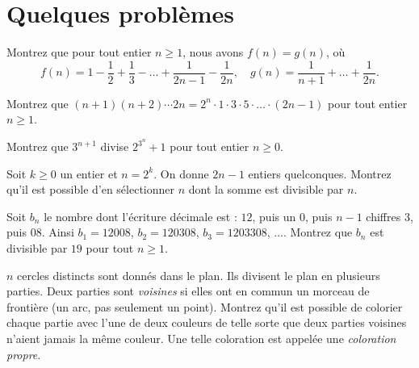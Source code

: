 \section*{Quelques problèmes}

\begin{problem}
Montrez que pour tout entier $n \geq 1$, nous avons $f(n) = g(n)$, où
\[
f(n) = 1 - \frac{1}{2} + \frac{1}{3} - \dots + \frac{1}{2n-1} - \frac{1}{2n}, \quad g(n) = \frac{1}{n+1} + \dots + \frac{1}{2n}.
\]
\end{problem}

\begin{problem}
Montrez que $(n+1)(n+2) \cdots 2n = 2^n \cdot 1 \cdot 3 \cdot 5 \cdot \dots \cdot (2n-1)$ pour tout entier $n \geq 1$.
\end{problem}

\begin{problem}
Montrez que $3^{n+1}$ divise $2^{3^n} + 1$ pour tout entier $n \geq 0$.
\end{problem}
\begin{problem}
Soit $k \geq 0$ un entier et $n = 2^k$. On donne $2n-1$ entiers quelconques. Montrez qu'il est possible d'en sélectionner $n$ dont la somme est divisible par $n$.
\end{problem}

\begin{problem}
Soit $b_n$ le nombre dont l'écriture décimale est : $12$, puis un $0$, puis $n-1$ chiffres $3$, puis $08$. Ainsi $b_1 = 12008$, $b_2 = 120308$, $b_3 = 1203308$, $\dots$. Montrez que $b_n$ est divisible par $19$ pour tout $n \geq 1$.
\end{problem}

\begin{problem}
    $n$ cercles distincts sont donnés dans le plan.
    Ils divisent le plan en plusieurs parties.
    Deux parties sont \emph{voisines} si elles ont en commun un morceau de frontière (un arc, pas seulement un point).
    Montrez qu'il est possible de colorier chaque partie avec l'une de deux couleurs de telle sorte que deux parties voisines n'aient jamais la même couleur.
    Une telle coloration est appelée une \emph{coloration propre}.
\end{problem}


